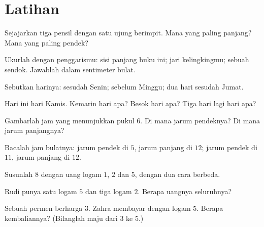 \section{Latihan}

\begin{exercise}[$\star$]\label{exo:g1:measure:1}
Sejajarkan tiga pensil dengan satu ujung berimpit. Mana yang paling
panjang? Mana yang paling pendek?
\end{exercise}

\begin{exercise}[$\star$]\label{exo:g1:measure:2}
Ukurlah dengan penggarismu: sisi panjang buku ini; jari kelingkingmu;
sebuah sendok. Jawablah dalam sentimeter bulat.
\end{exercise}

\begin{exercise}[$\star$]\label{exo:g1:measure:3}
Sebutkan harinya: sesudah Senin; sebelum Minggu; dua hari sesudah Jumat.
\end{exercise}

\begin{exercise}[$\star$]\label{exo:g1:measure:4}
Hari ini hari Kamis. Kemarin hari apa? Besok hari apa? Tiga hari lagi
hari apa?
\end{exercise}

\begin{exercise}[$\star$]\label{exo:g1:measure:5}
Gambarlah jam yang menunjukkan pukul $6$. Di mana jarum pendeknya? Di
mana jarum panjangnya?
\end{exercise}

\begin{exercise}[$\star$]\label{exo:g1:measure:6}
Bacalah jam bulatnya: jarum pendek di $5$, jarum panjang di $12$;
jarum pendek di $11$, jarum panjang di $12$.
\end{exercise}

\begin{exercise}[$\star$]\label{exo:g1:measure:7}
Susunlah $8$ dengan uang logam $1$, $2$ dan $5$, dengan dua cara berbeda.
\end{exercise}

\begin{exercise}[$\star$]\label{exo:g1:measure:8}
Rudi punya satu logam $5$ dan tiga logam $2$. Berapa  uangnya
seluruhnya?
\end{exercise}

\begin{exercise}[$\star\star$]\label{exo:g1:measure:9}
Sebuah permen berharga $3$. Zahra membayar dengan logam $5$. Berapa
kembaliannya? (Bilanglah maju dari $3$ ke $5$.)

\end{exercise}

